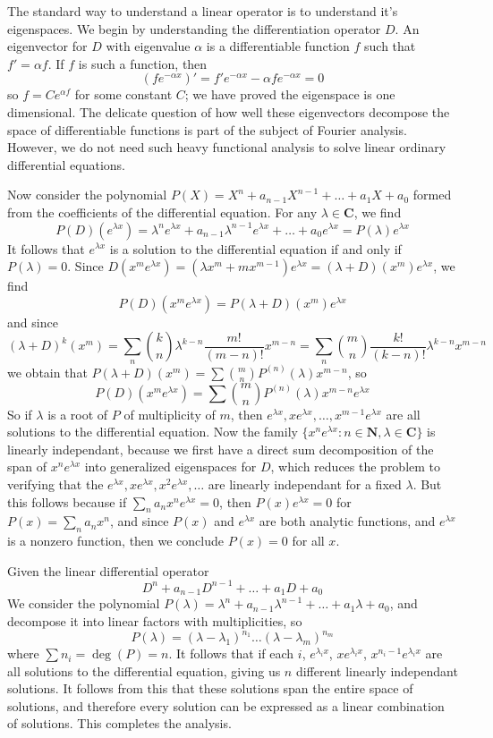 The standard way to understand a linear operator is to understand it's eigenspaces. We begin by understanding the differentiation operator $D$. An eigenvector for $D$ with eigenvalue $\alpha$ is a differentiable function $f$ such that $f' = \alpha f$. If $f$ is such a function, then
%
\[ (fe^{-\alpha x})' = f'e^{-\alpha x} - \alpha f e^{-\alpha x} = 0 \]
%
so $f = Ce^{\alpha f}$ for some constant $C$; we have proved the eigenspace is one dimensional. The delicate question of how well these eigenvectors decompose the space of differentiable functions is part of the subject of Fourier analysis. However, we do not need such heavy functional analysis to solve linear ordinary differential equations.

Now consider the polynomial $P(X) = X^n + a_{n-1}X^{n-1} + \dots + a_1X + a_0$ formed from the coefficients of the differential equation. For any $\lambda \in \mathbf{C}$, we find
%
\[ P(D)(e^{\lambda x}) = \lambda^n e^{\lambda x} + a_{n-1} \lambda^{n-1} e^{\lambda x} + \dots + a_0 e^{\lambda x} = P(\lambda) e^{\lambda x} \]
%
It follows that $e^{\lambda x}$ is a solution to the differential equation if and only if $P(\lambda) = 0$. Since $D(x^m e^{\lambda x}) = (\lambda x^m + mx^{m-1})e^{\lambda x} = (\lambda + D)(x^m) e^{\lambda x}$, we find
%
\[ P(D)(x^m e^{\lambda x}) = P(\lambda + D)(x^m) e^{\lambda x} \]
%
and since
%
\[ (\lambda + D)^k(x^m) = \sum_n {k \choose n} \lambda^{k-n} \frac{m!}{(m-n)!} x^{m-n} = \sum_n {m \choose n} \frac{k!}{(k-n)!} \lambda^{k-n} x^{m-n} \]
%
we obtain that $P(\lambda + D)(x^m) = \sum {m \choose n} P^{(n)}(\lambda) x^{m-n}$, so
%
\[ P(D)(x^m e^{\lambda x}) = \sum {m \choose n} P^{(n)}(\lambda) x^{m-n} e^{\lambda x} \]
%
So if $\lambda$ is a root of $P$ of multiplicity of $m$, then $e^{\lambda x}, xe^{\lambda x}, \dots, x^{m-1}e^{\lambda x}$ are all solutions to the differential equation. Now the family $\{ x^ne^{\lambda x} : n \in \mathbf{N}, \lambda \in \mathbf{C} \}$ is linearly independant, because we first have a direct sum decomposition of the span of $x^ne^{\lambda x}$ into generalized eigenspaces for $D$, which reduces the problem to verifying that the $e^{\lambda x}, xe^{\lambda x}, x^2e^{\lambda x}, \dots$ are linearly independant for a fixed $\lambda$. But this follows because if $\sum_n a_nx^ne^{\lambda x} = 0$, then $P(x)e^{\lambda x} = 0$ for $P(x) = \sum_n a_nx^n$, and since $P(x)$ and $e^{\lambda x}$ are both analytic functions, and $e^{\lambda x}$ is a nonzero function, then we conclude $P(x) = 0$ for all $x$.

Given the linear differential operator
%
\[ D^n + a_{n-1}D^{n-1} + \dots + a_1D + a_0 \]
%
We consider the polynomial $P(\lambda) = \lambda^n + a_{n-1}\lambda^{n-1} + \dots + a_1\lambda + a_0$, and decompose it into linear factors with multiplicities, so
%
\[ P(\lambda) = (\lambda - \lambda_1)^{n_1} \dots (\lambda - \lambda_m)^{n_m} \]
%
where $\sum n_i = \deg(P) = n$. It follows that if each $i$, $e^{\lambda_i x}$, $xe^{\lambda_i x}$, $x^{n_i - 1}e^{\lambda_i x}$ are all solutions to the differential equation, giving us $n$ different linearly independant solutions. It follows from this that these solutions span the entire space of solutions, and therefore every solution can be expressed as a linear combination of solutions. This completes the analysis.

